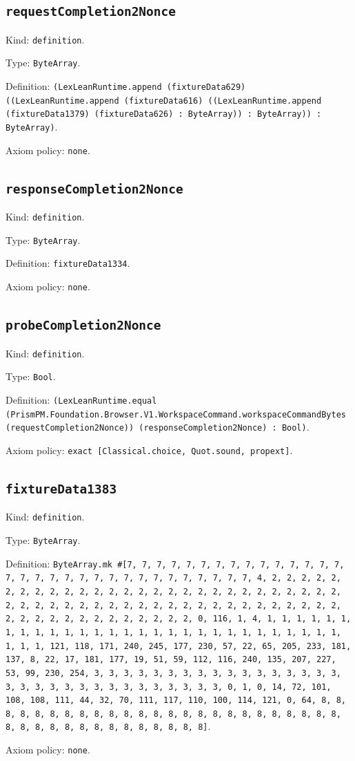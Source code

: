 \documentclass[11pt]{article}
\begin{document}
\subsection*{\texttt{requestCompletion2Nonce}}
\noindent Kind: \texttt{definition}.\par
\noindent Type: \texttt{ByteArray}.\par
\noindent Definition: \texttt{(LexLeanRuntime.append (fixtureData629) ((LexLeanRuntime.append (fixtureData616) ((LexLeanRuntime.append (fixtureData1379) (fixtureData626) : ByteArray)) : ByteArray)) : ByteArray)}.\par
\noindent Axiom policy: \texttt{none}.\par
\subsection*{\texttt{responseCompletion2Nonce}}
\noindent Kind: \texttt{definition}.\par
\noindent Type: \texttt{ByteArray}.\par
\noindent Definition: \texttt{fixtureData1334}.\par
\noindent Axiom policy: \texttt{none}.\par
\subsection*{\texttt{probeCompletion2Nonce}}
\noindent Kind: \texttt{definition}.\par
\noindent Type: \texttt{Bool}.\par
\noindent Definition: \texttt{(LexLeanRuntime.equal (PrismPM.Foundation.Browser.V1.WorkspaceCommand.workspaceCommandBytes (requestCompletion2Nonce)) (responseCompletion2Nonce) : Bool)}.\par
\noindent Axiom policy: \texttt{exact [Classical.choice, Quot.sound, propext]}.\par
\subsection*{\texttt{fixtureData1383}}
\noindent Kind: \texttt{definition}.\par
\noindent Type: \texttt{ByteArray}.\par
\noindent Definition: \texttt{ByteArray.mk \#[7, 7, 7, 7, 7, 7, 7, 7, 7, 7, 7, 7, 7, 7, 7, 7, 7, 7, 7, 7, 7, 7, 7, 7, 7, 7, 7, 7, 7, 7, 7, 7, 4, 2, 2, 2, 2, 2, 2, 2, 2, 2, 2, 2, 2, 2, 2, 2, 2, 2, 2, 2, 2, 2, 2, 2, 2, 2, 2, 2, 2, 2, 2, 2, 2, 2, 2, 2, 2, 2, 2, 2, 2, 2, 2, 2, 2, 2, 2, 2, 2, 2, 2, 2, 2, 2, 2, 2, 2, 2, 2, 2, 2, 2, 2, 2, 2, 0, 116, 1, 4, 1, 1, 1, 1, 1, 1, 1, 1, 1, 1, 1, 1, 1, 1, 1, 1, 1, 1, 1, 1, 1, 1, 1, 1, 1, 1, 1, 1, 1, 1, 1, 1, 121, 118, 171, 240, 245, 177, 230, 57, 22, 65, 205, 233, 181, 137, 8, 22, 17, 181, 177, 19, 51, 59, 112, 116, 240, 135, 207, 227, 53, 99, 230, 254, 3, 3, 3, 3, 3, 3, 3, 3, 3, 3, 3, 3, 3, 3, 3, 3, 3, 3, 3, 3, 3, 3, 3, 3, 3, 3, 3, 3, 3, 3, 3, 3, 0, 1, 0, 14, 72, 101, 108, 108, 111, 44, 32, 70, 111, 117, 110, 100, 114, 121, 0, 64, 8, 8, 8, 8, 8, 8, 8, 8, 8, 8, 8, 8, 8, 8, 8, 8, 8, 8, 8, 8, 8, 8, 8, 8, 8, 8, 8, 8, 8, 8, 8, 8, 8, 8, 8, 8, 8, 8, 8]}.\par
\noindent Axiom policy: \texttt{none}.\par
\end{document}
